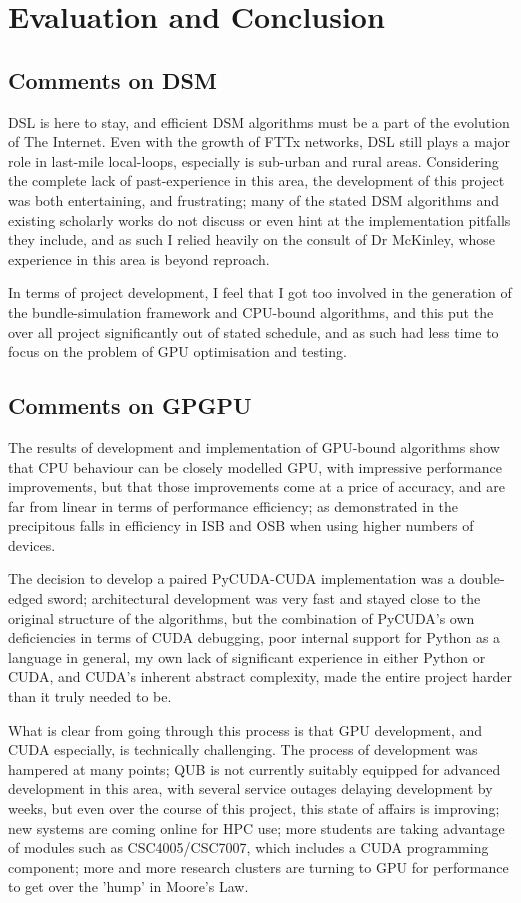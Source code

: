 \chapter{Evaluation and Conclusion}
\section{Comments on DSM}
 DSL is here to stay, and efficient DSM algorithms must be a part of the evolution of The Internet. Even with the growth of FTTx networks, DSL still plays a major role in last-mile local-loops, especially is sub-urban and rural areas. Considering the complete lack of past-experience in this area, the development of this project was both entertaining, and frustrating; many of the stated DSM algorithms and existing scholarly works do not discuss or even hint at the implementation pitfalls they include, and as such I relied heavily on the consult of Dr McKinley, whose experience in this area is beyond reproach.

 In terms of project development, I feel that I got too involved in the generation of the bundle-simulation framework and CPU-bound algorithms, and this put the over all project significantly out of stated schedule, and as such had less time to focus on the problem of GPU optimisation and testing.

\section{Comments on GPGPU}
The results of development and implementation of GPU-bound algorithms show that CPU behaviour can be closely modelled GPU, with impressive performance improvements, but that those improvements come at a price of accuracy, and are far from linear in terms of performance efficiency; as demonstrated in the precipitous falls in efficiency in ISB and OSB when using higher numbers of devices.

The decision to develop a paired PyCUDA-CUDA implementation was a double-edged sword; architectural development was very fast and stayed close to the original structure of the algorithms, but the combination of PyCUDA's own deficiencies in terms of CUDA debugging, poor internal support for Python as a language in general, my own lack of significant experience in either Python or CUDA, and CUDA's inherent abstract complexity, made the entire project harder than it truly needed to be.

What is clear from going through this process is that GPU development, and CUDA especially, is technically challenging. The process of development was hampered at many points; QUB is not currently suitably equipped for advanced development in this area, with several service outages delaying development by weeks, but even over the course of this project, this state of affairs is improving; new systems are coming online for HPC use; more students are taking advantage of modules such as CSC4005/CSC7007, which includes a CUDA programming component; more and more research clusters are turning to GPU for performance to get over the 'hump' in Moore's Law.

